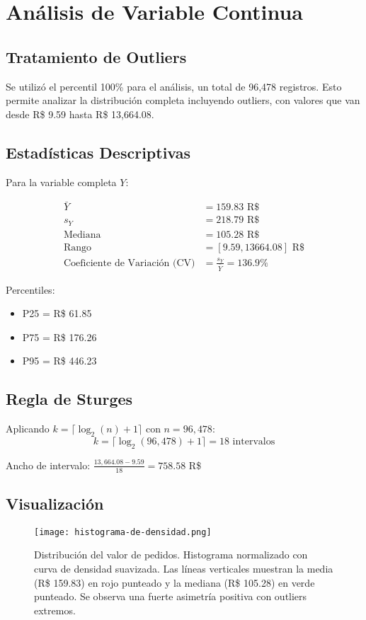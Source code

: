 \documentclass[12pt,a4paper,twoside]{article}
\begin{document}
\section{Análisis de Variable Continua}

\subsection{Tratamiento de Outliers}
Se utilizó el percentil 100\% para el análisis, un total de 96,478 registros. Esto permite analizar la distribución completa incluyendo outliers, con valores que van desde R\$ 9.59 hasta R\$ 13,664.08.


\subsection{Estadísticas Descriptivas}
Para la variable completa $Y$:

\begin{align}
\bar{Y} &= 159.83 \text{ R\$} \\
s_Y &= 218.79 \text{ R\$} \\
\text{Mediana} &= 105.28 \text{ R\$} \\
\text{Rango} &= [9.59, 13664.08] \text{ R\$} \\
\text{Coeficiente de Variación (CV)} &= \frac{s_Y}{\bar{Y}} = 136.9\%
\end{align}

Percentiles:
\begin{itemize}
    \item P25 = R\$ 61.85
    \item P75 = R\$ 176.26  
    \item P95 = R\$ 446.23
\end{itemize}

\subsection{Regla de Sturges}
Aplicando $k = \lceil \log_2(n) + 1 \rceil$ con $n = 96,478$:
$$k = \lceil \log_2(96,478) + 1 \rceil = 18 \text{ intervalos}$$

Ancho de intervalo: $\frac{13,664.08 - 9.59}{18} = 758.58$ R\$

\subsection{Visualización}
\begin{figure}[H]
\centering
\texttt{[image: histograma-de-densidad.png]}
\caption{Distribución del valor de pedidos. Histograma normalizado con curva de densidad suavizada. Las líneas verticales muestran la media (R\$ 159.83) en rojo punteado y la mediana (R\$ 105.28) en verde punteado. Se observa una fuerte asimetría positiva con outliers extremos.}
\label{fig:histograma-densidad}
\end{figure}
\end{document}
